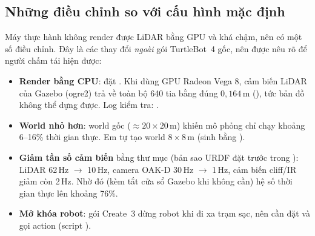\subsection{Những điều chỉnh so với cấu hình mặc định}
Máy thực hành không render được LiDAR bằng GPU và khá chậm, nên có một số điều chỉnh. Đây là các thay đổi
\emph{ngoài} gói TurtleBot~4 gốc, nên được nêu rõ để người chấm tái hiện được:
\begin{itemize}
\item \textbf{Render bằng CPU}: đặt . Khi dùng GPU Radeon Vega 8, cảm biến
LiDAR của Gazebo (ogre2) trả về toàn bộ 640 tia bằng đúng $0{,}164$\,m (), tức bản đồ không thể dựng được.
Log kiểm tra: .
\item \textbf{World nhỏ hơn}: world  gốc ($\approx 20\times 20$\,m) khiến mô phỏng chỉ chạy
khoảng 6--16\% thời gian thực. Em tự tạo world $8\times 8$\,m (sinh bằng ).
\item \textbf{Giảm tần số cảm biến} bằng thư mục  (bản sao URDF đặt trước trong
): LiDAR 62\,Hz $\to$ 10\,Hz, camera OAK-D 30\,Hz $\to$ 1\,Hz, cảm biến cliff/IR giảm còn 2\,Hz.
Nhờ đó (kèm tắt cửa sổ Gazebo khi không cần) hệ số thời gian thực lên khoảng 76\%.
\item \textbf{Mở khóa robot}: gói Create~3 dừng robot khi đi xa trạm sạc, nên cần đặt
 và gọi action  (script ).
\end{itemize}
